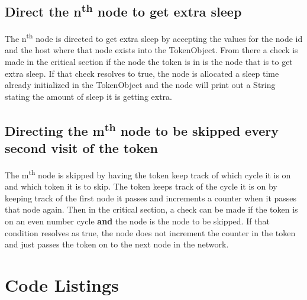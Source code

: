 \documentclass[11pt, a4paper]{article}
\begin{document}
\subsection{Direct the n\textsuperscript{th} node to get extra sleep}

The n\textsuperscript{th} node is directed to get extra sleep by accepting the values for the node id and the host where that node exists into the TokenObject. From there a check is made in the critical section if the node the token is in is the node that is to get extra sleep. If that check resolves to true, the node is allocated a sleep time already initialized in the TokenObject and the node will print out a String stating the amount of sleep it is getting extra. 

\subsection{Directing the m\textsuperscript{th} node to be skipped every second visit of the token}

The m\textsuperscript{th} node is skipped by having the token keep track of which cycle it is on and which token it is to skip. The token keeps track of the cycle it is on by keeping track of the first node it passes and increments a counter when it passes that node again. Then in the critical section, a check can be made if the token is on an even number cycle \textbf{and} the node is the node to be skipped. If that condition resolves as true, the node does not increment the counter in the token and just passes the token on to the next node in the network.

\appendix

\newpage
{}

\section{Code Listings}
\end{document}
